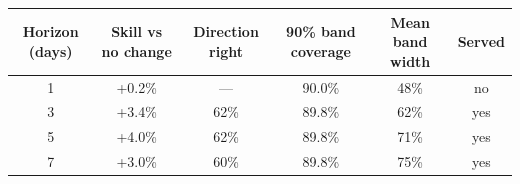 \renewcommand{\arraystretch}{1.25}
\footnotesize
\begin{tabular}{|c|c|c|c|c|c|}
\hline
\textbf{Horizon (days)} & \textbf{Skill vs no change} & \textbf{Direction right} & \textbf{90\% band coverage} & \textbf{Mean band width} & \textbf{Served} \\
\hline
1 & +0.2\% & --- & 90.0\% & 48\% & no \\
\hline
3 & +3.4\% & 62\% & 89.8\% & 62\% & yes \\
\hline
5 & +4.0\% & 62\% & 89.8\% & 71\% & yes \\
\hline
7 & +3.0\% & 60\% & 89.8\% & 75\% & yes \\
\hline
\end{tabular}
